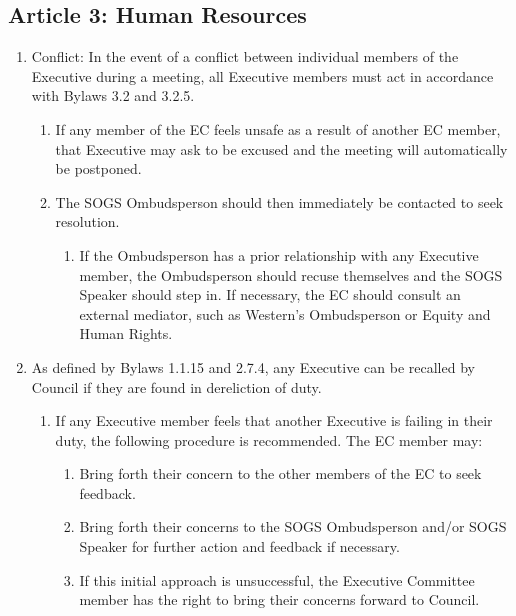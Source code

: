 \subsection{Article 3: Human Resources}
\begin{enumerate}[label*=\arabic*., align=left]
\item Conflict: In the event of a conflict between individual members of the Executive during a meeting, all Executive members must act in accordance with Bylaws 3.2 and 3.2.5.
\begin{enumerate}[label*=\arabic*., align=left]
\item If any member of the EC feels unsafe as a result of another EC member, that Executive may ask to be excused and the meeting will automatically be postponed. 
\item The SOGS Ombudsperson should then immediately be contacted to seek resolution.
\begin{enumerate}[label*=\arabic*., align=left]
\item If the Ombudsperson has a prior relationship with any Executive member, the Ombudsperson should recuse themselves and the SOGS Speaker should step in. If necessary, the EC should consult an external mediator, such as Western’s Ombudsperson or Equity and Human Rights.
\end{enumerate}
\end{enumerate}
\item As defined by Bylaws 1.1.15 and 2.7.4, any Executive can be recalled by Council if they are found in dereliction of duty.
\begin{enumerate}[label*=\arabic*., align=left]
\item If any Executive member feels that another Executive is failing in their duty, the following procedure is recommended. The EC member may:
\begin{enumerate}[label*=\arabic*., align=left]
\item Bring forth their concern to the other members of the EC to seek feedback.
\item Bring forth their concerns to the SOGS Ombudsperson and/or SOGS Speaker for further action and feedback if necessary.
\item If this initial approach is unsuccessful, the Executive Committee member has the right to bring their concerns forward to Council.
\end{enumerate}
\end{enumerate}
\end{enumerate}
